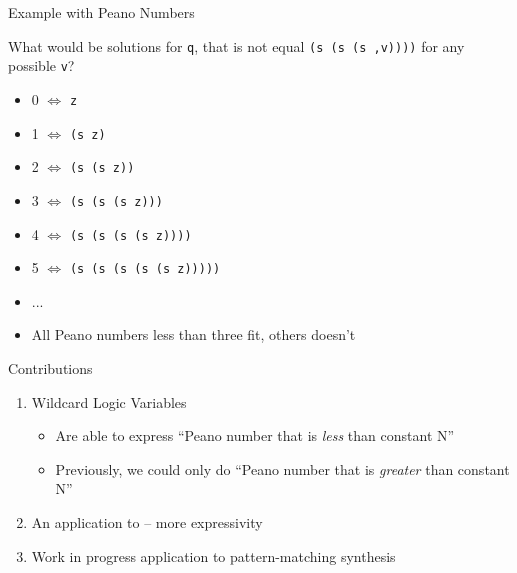 \documentclass[aspectratio=169
  , xcolor={svgnames}
  , hyperref=
      { colorlinks
      , urlcolor=DarkBlue
      }
  , russian  %
  ]{beamer}
\begin{document}
\begin{frame}{Example with Peano Numbers}

What would be solutions for \texttt{q}, that is not equal \texttt{(s (s (s ,v))))} for any possible \texttt{v}?

\begin{itemize}
\item[\faGood] 0 $\Leftrightarrow$ \texttt{z}
\item[\faGood] 1 $\Leftrightarrow$ \texttt{(s z)}
\item[\faGood] 2 $\Leftrightarrow$ \texttt{(s (s z))}
\item[\faBad]  3 $\Leftrightarrow$ \texttt{(s (s (s z)))}
\item[\faBad]  4 $\Leftrightarrow$ \texttt{(s (s (s (s z))))}
\item[\faBad]  5 $\Leftrightarrow$ \texttt{(s (s (s (s (s z)))))}
\item ...
\item All Peano numbers less than three fit, others doesn't
\end{itemize}
\end{frame}

\begin{frame}{Contributions}
\begin{enumerate}
\item Wildcard Logic Variables
\begin{itemize}
\item Are able to express ``Peano number that is \emph{less} than constant N''
\item Previously, we could only do ``Peano number that is  \emph{greater} than constant N''
\end{itemize}
\item An application to \noCanren{} -- more expressivity
\item Work in progress application to pattern-matching synthesis
\end{enumerate}
\end{frame}
\end{document}
